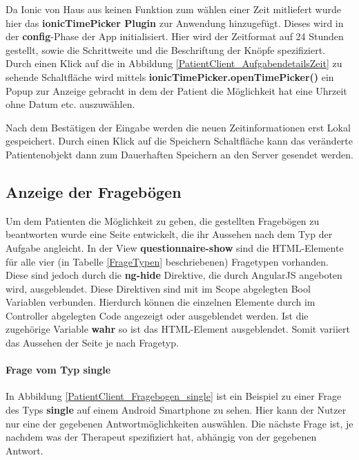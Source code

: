 Da Ionic von Haus aus keinen Funktion zum wählen einer Zeit mitliefert wurde hier das \textbf{ionicTimePicker Plugin} zur Anwendung hinzugefügt. Dieses wird in der \textbf{config}-Phase der App initialisiert. Hier wird der Zeitformat auf 24 Stunden gestellt, sowie die Schrittweite und die Beschriftung der Knöpfe spezifiziert. Durch einen Klick auf die in Abbildung \ref{PatientClient_AufgabendetailsZeit} zu sehende Schaltfläche wird mittels \textbf{ionicTimePicker.openTimePicker()} ein Popup zur Anzeige gebracht in dem der Patient die Möglichkeit hat eine Uhrzeit ohne Datum etc. auszuwählen.

Nach dem Bestätigen der Eingabe werden die neuen Zeitinformationen erst Lokal gespeichert. Durch einen Klick auf die Speichern Schaltfläche kann das veränderte Patientenobjekt dann zum Dauerhaften Speichern an den Server gesendet werden.

\subsection{Anzeige der Fragebögen}
Um dem Patienten die Möglichkeit zu geben, die gestellten Fragebögen zu beantworten wurde eine Seite entwickelt, die ihr Aussehen nach dem Typ der Aufgabe angleicht. In der View \textbf{questionnaire-show} sind die HTML-Elemente für alle vier (in Tabelle \ref{FrageTypen} beschriebenen) Fragetypen vorhanden. Diese sind jedoch durch die \textbf{ng-hide} Direktive, die durch AngularJS angeboten wird, ausgeblendet. Diese Direktiven sind mit im Scope abgelegten Bool Variablen verbunden. Hierdurch können die einzelnen Elemente durch im Controller abgelegten Code angezeigt oder ausgeblendet werden. Ist die zugehörige Variable \textbf{wahr} so ist das HTML-Element ausgeblendet. 
Somit variiert das Aussehen der Seite je nach Fragetyp.
\paragraph{Frage vom Typ single}
In Abbildung \ref{PatientClient_Fragebogen_single} ist ein Beispiel zu einer Frage des Typs \textbf{single} auf einem Android Smartphone zu sehen. Hier kann der Nutzer nur eine der gegebenen Antwortmöglichkeiten auswählen. Die nächste Frage ist, je nachdem was der Therapeut spezifiziert hat, abhängig von der gegebenen Antwort.

